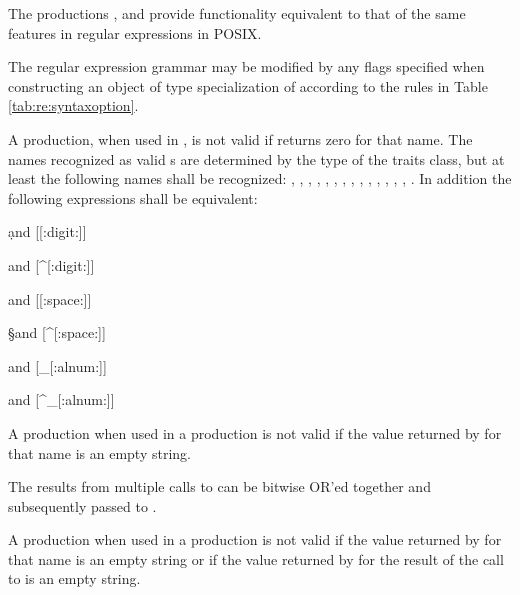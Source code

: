 \pnum
The productions , 
and  provide functionality
equivalent to that of the same features in regular expressions in POSIX.

\pnum
The regular expression grammar may be modified by
any  flags specified when
constructing an object of type specialization of 
according to the rules in Table \ref{tab:re:syntaxoption}.

\pnum
A  production, when used in ,
is not valid if  returns zero for
that name.  The names recognized as valid s are
determined by the type of the traits class, but at least the following
names shall be recognized: 
, , , , , 
, , , , , 
, , , , .
In addition the following expressions shall be equivalent:

\begin{codeblock}
\d and [[:digit:]]

\D and [^[:digit:]]

\s and [[:space:]]

\S and [^[:space:]]

\w and [_[:alnum:]]

\W and [^_[:alnum:]]
\end{codeblock}

\pnum
{}%
%
A  production when used in
a  production is not valid 
if the value returned by  for
that name is an empty string. 

\pnum
{}%
%
%
%
The results from multiple calls
to  can be bitwise OR'ed 
together and subsequently passed to .

\pnum
{}%
%
A  production when used in
a  production is not valid if the value
returned by  for that name is an
empty string or if the value returned by  
for the result of the call to 
is an empty string. 

